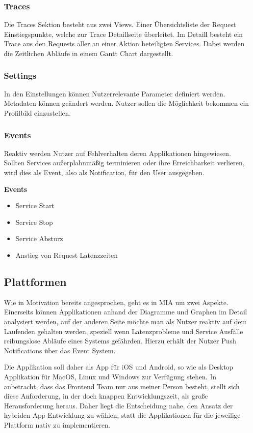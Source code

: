 \subsubsection{Traces}

Die Traces Sektion besteht aus zwei Views. Einer Übersichtsliste der Request Einstiegspunkte,
welche zur Trace Detaillseite überleitet. Im Detaill besteht ein Trace aus den Requests
aller an einer Aktion beteiligten Services. Dabei werden die Zeitlichen Abläufe in einem Gantt Chart dargestellt.

\subsubsection{Settings}

In den Einstellungen können Nutzerrelevante Parameter definiert werden. Metadaten können geändert werden.
Nutzer sollen die Möglichkeit bekommen ein Profilbild einzustellen.

\subsubsection{Events}

Reaktiv werden Nutzer auf Fehlverhalten deren Applikationen hingewiesen. Sollten Services außerplahnmäßig terminieren oder ihre Erreichbarkeit verlieren,
wird dies als Event, also als Notification, für den User ausgegeben.

\vspace{1cm}
\textbf{Events}
\begin{itemize}
\item Service Start
\item Service Stop
\item Service Absturz
\item Anstieg von Request Latenzzeiten
\end{itemize}
\vspace{1cm}


\subsection{Plattformen}

Wie in Motivation bereits angesprochen, geht es in MIA um zwei Aspekte. Einerseits können Applikationen anhand der Diagramme und Graphen im Detail analysiert werden,
auf der anderen Seite möchte man als Nutzer reaktiv auf dem Laufenden gehalten werden, speziell wenn Latenzprobleme und Service Ausfälle reibungslose Abläufe eines Systems gefährden.
Hierzu erhält der Nutzer Push Notifications über das Event System.

Die Applikation soll daher als App für iOS und Android, so wie als Desktop Applikation für MacOS, Linux und Windows zur Verfügung stehen.
In anbetracht, dass das Frontend Team nur aus meiner Person besteht, stellt sich diese Anforderung, in der doch knappen Entwicklungszeit, als große Herausforderung heraus.
Daher liegt die Entscheidung nahe, den Ansatz der hybriden App Entwicklung zu wählen, statt die Applikationen für die jeweilige Plattform nativ zu implementieren.
